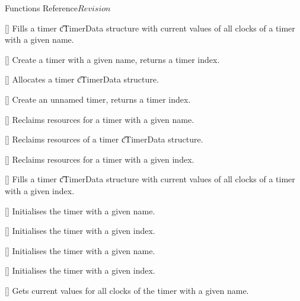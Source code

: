 \begin{cactuspart}{ Functions Reference}{}{$Revision$}
\begin{Lentry}
\item[\code{CCTK\_Timer}] [\pageref{CCTK-Timer}]
  Fills a timer {\t cTimerData} structure with current values of all clocks
  of a timer with a given name.

\item[\code{CCTK\_TimerCreate}] [\pageref{CCTK-TimerCreate}]
  Create a timer with a given name, returns a timer index.

\item[\code{CCTK\_TimerCreateData}] [\pageref{CCTK-TimerCreateData}]
  Allocates a timer {\t cTimerData} structure.

\item[\code{CCTK\_TimerCreateI}] [\pageref{CCTK-TimerCreateI}]
  Create an unnamed timer, returns a timer index.

\item[\code{CCTK\_TimerDestroy}] [\pageref{CCTK-TimerDestroy}]
  Reclaims resources for a timer with a given name.

\item[\code{CCTK\_TimerDestroyData}] [\pageref{CCTK-TimerDestroyData}]
  Reclaims resources of a timer {\t cTimerData} structure.

\item[\code{CCTK\_TimerDestroyI}] [\pageref{CCTK-TimerDestroyI}]
  Reclaims resources for a timer with a given index.

\item[\code{CCTK\_TimerI}] [\pageref{CCTK-TimerI}]
  Fills a timer {\t cTimerData} structure with current values of all clocks
  of a timer with a given index.

\item[\code{CCTK\_TimerReset}] [\pageref{CCTK-TimerReset}]
  Initialises the timer with a given name.

\item[\code{CCTK\_TimerResetI}] [\pageref{CCTK-TimerResetI}]
  Initialises the timer with a given index.

\item[\code{CCTK\_TimerStart}] [\pageref{CCTK-TimerStart}]
  Initialises the timer with a given name.

\item[\code{CCTK\_TimerStartI}] [\pageref{CCTK-TimerStartI}]
  Initialises the timer with a given index.

\item[\code{CCTK\_TimerStop}] [\pageref{CCTK-TimerStop}]
  Gets current values for all clocks of the timer with a given name.


\end{Lentry}
\end{cactuspart}
